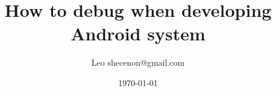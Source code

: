 \documentclass[a4paper,titlepage]{article}
\title{How to debug when developing Android system}
\author{Leo shecenon@gmail.com}
\date{\today}
\begin{document}
\maketitle
\renewcommand{\refname}{参考文献}
\renewcommand\contentsname{目录}
\renewcommand\listfigurename{插图目录}
\renewcommand\listtablename{表格目录}
\renewcommand\indexname{索引}
\renewcommand\appendixname{附录}
\renewcommand\figurename{图}
\renewcommand\tablename{表}
\renewcommand{\lstlistlistingname}{代码列表集}
\renewcommand{\lstlistingname}{代码}

\makeatletter
\let\VERBATIM\verbatim
\def\verbatim{%
\def\verbatim@font{\footnotesize\ttfamily}%
\VERBATIM}

\newenvironment{myverbatim}%
{\verbatim\def\verbatim@font{\tiny\ttfamily}}%
{\endverbatim}

\makeatletter

\begin{multicols}{2}
\tableofcontents
\listoftables
\listoffigures
\end{multicols}

\newlength{\mmfontsize}
\setlength{\mmfontsize}{11pt}
\setlength{\parskip}{0pt}
\renewcommand{\labelitemii}{$\circ$}
\newcommand{\listparam}{\setlength{\parsep}{\parskip}
\setlength{\itemsep}{0ex}%
\setlength{\labelwidth}{2\mmfontsize}
\setlength{\labelsep}{.5\mmfontsize}
\setlength{\topsep}{0pt}
\setlength{\partopsep}{0pt}
\setlength{\leftmargin}{2\mmfontsize}
}%

\begin{comment}
\newcount\xuslcount
\xuslcount=1 {\xuslcount=2 } \show\xuslcount
\typeout{\marginparwidth xxxxxx}
\message{xx ^^j  sdfsd dfsdf}
{\def\a{b}\a
\def\foo#1?#2\par{\set{#1!}\set{#2?}}
\show\foo

\scrollmode
\tracingoutput9
\tracingonline1

\font\tenroman=cmr10 \tenroman
\setbox0=\hbox{g}

\ifx\a\empty \ a is empty
\else
\textbackslash a is \a
\fi
}
\def\ifEqString#1#2%
    {\def\csa{#1}\def\csb{#2}\ifx\csa\csb }

    \ifEqString{good}{good}
    sssss
    \fi
usb^^+
\texttt{[image: mu.mps]}
\end{comment}
\end{document}
